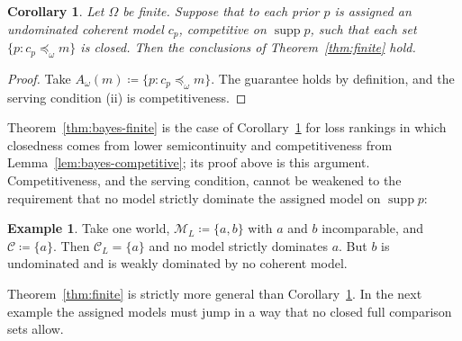 \documentclass[11pt]{article}
\newtheorem{corollary}[theorem]{Corollary}
\theoremstyle{definition}
\newtheorem{example}[theorem]{Example}
\theoremstyle{remark}
\newcommand{\M}{\mathcal M}
\newcommand{\C}{\mathcal C}
\newcommand{\supp}{\operatorname{supp}}
\begin{document}
\begin{corollary}\label{cor:closed-choice}
Let $\Omega$ be finite. Suppose that to each prior $p$ is assigned an undominated coherent model $c_p$, competitive on $\supp p$, such that each set $\{p:c_p\preceq_\omega m\}$ is closed. Then the conclusions of Theorem~\ref{thm:finite} hold.
\end{corollary}
\begin{proof}
Take $A_\omega(m)\coloneqq\{p:c_p\preceq_\omega m\}$. The guarantee holds by definition, and the serving condition (ii) is competitiveness.
\end{proof}

Theorem~\ref{thm:bayes-finite} is the case of Corollary~\ref{cor:closed-choice} for loss rankings in which closedness comes from lower semicontinuity and competitiveness from Lemma~\ref{lem:bayes-competitive}; its proof above is this argument. Competitiveness, and the serving condition, cannot be weakened to the requirement that no model strictly dominate the assigned model on $\supp p$:

\begin{example}\label{ex:incomparable}
Take one world, $\M_L\coloneqq\{a,b\}$ with $a$ and $b$ incomparable, and $\C\coloneqq\{a\}$. Then $\C_L=\{a\}$ and no model strictly dominates $a$. But $b$ is undominated and is weakly dominated by no coherent model.
\end{example}

Theorem~\ref{thm:finite} is strictly more general than Corollary~\ref{cor:closed-choice}. In the next example the assigned models must jump in a way that no closed full comparison sets allow.
\end{document}
